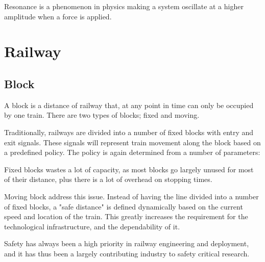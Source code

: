 Resonance is a phenomenon in physics making a system oscillate at a higher amplitude when a force is applied.

\section{Railway}


\subsection{Block}
A block is a distance of railway that, at any point in time can only be occupied by one train. There are two types of blocks; fixed and moving.

Traditionally, railways are divided into a number of fixed blocks with entry and exit signals. These signals will represent train movement along the block based on a predefined policy. The policy is again determined from a number of parameters:






Fixed blocks wastes a lot of capacity, as most blocks go largely unused for most of their distance, plus there is a lot of overhead on stopping times.

Moving block address this issue. Instead of having the line divided into a number of fixed blocks, a "safe distance" is defined dynamically based on the current speed and location of the train.
This greatly increases the requirement for the technological infrastructure, and the dependability of it.

Safety has always been a high priority in railway engineering and deployment, and it has thus been a largely contributing industry to safety critical research.

